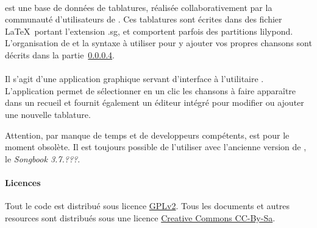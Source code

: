 \paragraph{\patadata}
\patadata est une base de données de tablatures, réalisée collaborativement par la communauté d'utilisateurs de \href{http://www.patacrep.com}{\patacrep}. Ces tablatures sont écrites dans des fichier \LaTeX\ portant l'extension .sg, et comportent parfois des partitions lilypond. L'organisation de \patadata et la syntaxe à utiliser pour y ajouter vos propres chansons sont décrits dans la partie~\ref{}.

\paragraph{\patagui}
Il s'agit d'une application graphique servant d'interface à l'utilitaire . L'application permet de sélectionner en un clic les chansons à faire apparaître dans un recueil et fournit également un éditeur intégré pour modifier ou ajouter une nouvelle tablature.

\begin{nota}
Attention, par manque de temps et de developpeurs compétents, \patagui est pour le moment obsolète. Il est toujours possible de l'utiliser avec l'ancienne version de \patacrep, le \emph{Songbook 3.7.???}.

\end{nota}


\paragraph{\patawww}
\todo

\paragraph{Licences}
Tout le code est distribué sous licence \href{http://www.gnu.org/licenses/gpl.html}{GPLv2}. Tous les documents
et autres resources sont distribués sous une licence \href{http://creativecommons.org/}{Creative Commons CC-By-Sa}.
